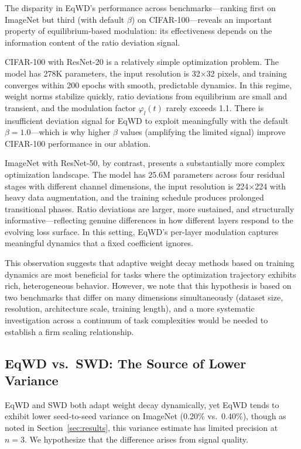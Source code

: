 \documentclass{article}
\begin{document}
The disparity in EqWD's performance across benchmarks---ranking first on
ImageNet but third (with default $\beta$) on CIFAR-100---reveals an
important property of equilibrium-based modulation: its effectiveness
depends on the information content of the ratio deviation signal.

CIFAR-100 with ResNet-20 is a relatively simple optimization problem.
The model has 278K parameters, the input resolution is 32$\times$32
pixels, and training converges within 200 epochs with smooth,
predictable dynamics. In this regime, weight norms stabilize quickly,
ratio deviations from equilibrium are small and transient, and the
modulation factor $\varphi_l(t)$ rarely exceeds 1.1. There is
insufficient deviation signal for EqWD to exploit meaningfully with the
default $\beta = 1.0$---which is why higher $\beta$ values
(amplifying the limited signal) improve CIFAR-100 performance in our
ablation.

ImageNet with ResNet-50, by contrast, presents a substantially more
complex optimization landscape. The model has 25.6M parameters across
four residual stages with different channel dimensions, the input
resolution is 224$\times$224 with heavy data augmentation, and the
training schedule produces prolonged transitional phases. Ratio
deviations are larger, more sustained, and structurally
informative---reflecting genuine differences in how different layers
respond to the evolving loss surface. In this setting, EqWD's per-layer
modulation captures meaningful dynamics that a fixed coefficient
ignores.

This observation suggests that adaptive weight decay methods based on
training dynamics are most beneficial for tasks where the optimization
trajectory exhibits rich, heterogeneous behavior. However, we note that
this hypothesis is based on two benchmarks that differ on many
dimensions simultaneously (dataset size, resolution, architecture scale,
training length), and a more systematic investigation across a continuum
of task complexities would be needed to establish a firm scaling
relationship.

\subsection{EqWD vs.\ SWD: The Source of Lower Variance}
\label{sec:variance}

EqWD and SWD both adapt weight decay dynamically, yet EqWD tends to
exhibit lower seed-to-seed variance on ImageNet (0.20\% vs.~0.40\%),
though as noted in Section~\ref{sec:results}, this variance estimate has limited
precision at $n = 3$. We hypothesize that the difference arises from
signal quality.
\end{document}
